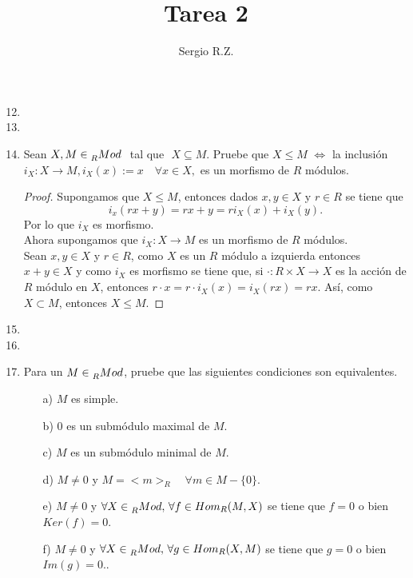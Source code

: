 \documentclass{article}
\title{Tarea 2}
\author{Sergio R.Z.}
\date{}
\theoremstyle{definition}
\theoremstyle{plain}
\theoremstyle{plain}
\theoremstyle{definition}
\theoremstyle{definition}
\theoremstyle{definition}
\theoremstyle{definition}
\theoremstyle{definition}
\theoremstyle{definition}
\begin{document}
	\maketitle
\begin{enumerate}[label=\textbf{Ej \arabic*.}]
		\setcounter{enumi}{11}
 \item
 \item
 \item Sean $X,M\in \prescript{}{R}{Mod}$\,\, tal que\,\, $X\subseteq M$. Pruebe que $X\leq M$ $\iff$ la inclusión $i_X:X\longrightarrow M,
 i_X(x):=x\quad \forall x\in X,$ es un morfismo de $R$ módulos.
 
 \begin{proof}
 \boxed{\Rightarrow} Supongamos que $X\leq M$, entonces dados $x,y\in X$ y $r\in R$ se tiene que 
 \[i_x(rx+y)=rx+y =ri_X(x)+i_X(y). \]
 Por lo que $i_X$ es morfismo.\\
 
 \boxed{\Leftarrow} Ahora supongamos que  $i_X:X\longrightarrow M$ es un morfismo de $R$ módulos.\\
 
 Sean $x,y\in X$ y $r\in R$, como $X$ es un $R$ módulo a izquierda entonces $x+y\in X$ y como $i_X$ es morfismo
 se tiene que, si $\cdot: R\times X\longrightarrow X$ es la acción de $R$ módulo en $X$, entonces 
 $r\cdot x = r\cdot i_X(x) = i_X(rx)=rx $. Así, como $X\subset M$, entonces $X\leq M$.
  \end{proof}
 
 \item
 \item
 \item Para un $M\in \prescript{}{R}{Mod}$, pruebe que las siguientes condiciones son equivalentes.
 \begin{itemize}
    \item[a)]  $M$ es simple.
    \item[b)]  $0$ es un submódulo maximal de $M$.
    \item[c)]  $M$ es un submódulo minimal de $M$.
    \item[d)]  $M\neq 0$ y $M=<m>_R\quad \forall m\in M-\{0\}$.
    \item[e)]  $M\neq 0$ y $\forall X\in \prescript{}{R}{Mod}, \,\forall f\in Hom_R(M,X)$ se tiene que $f=0$ o bien 
    $Ker(f)=0$.
    \item[f)]  $M\neq 0$ y $\forall X\in \prescript{}{R}{Mod}, \,\forall g\in Hom_R(X,M)$ se tiene que $g=0$ o bien 
 $Im(g)=0$..
 \end{itemize}
 

\end{enumerate}
\end{document}
